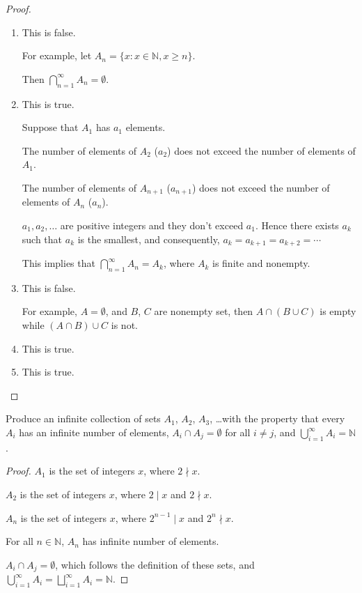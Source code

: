 \documentclass[class=understanding-analysis,crop=false]{standalone}
\begin{document}
\begin{proof}
    \begin{enumerate}[label = (\alph*)]
        \item This is false.
              \par For example, let $A_{n} = \{ x : x\in\mathbb{N}, x\ge n \}$.
              \par Then $\bigcap^{\infty}_{n=1}A_{n} = \emptyset$.
        \item This is true.
              \par Suppose that $A_{1}$ has $a_{1}$ elements.
              \par The number of elements of $A_{2}$ ($a_{2}$) does not exceed the number of elements of $A_{1}$.
              \par The number of elements of $A_{n+1}$ ($a_{n+1}$) does not exceed the number of elements of $A_{n}$ ($a_{n}$).
              \par $a_{1}, a_{2}, \ldots$ are positive integers and they don't exceed $a_{1}$. Hence there exists $a_{k}$ such that $a_{k}$ is the smallest, and consequently, $a_{k} = a_{k+1} = a_{k+2} = \cdots$
              \par This implies that $\bigcap^{\infty}_{n=1}A_{n} = A_{k}$, where $A_{k}$ is finite and nonempty.
        \item This is false.
              \par For example, $A = \emptyset$, and $B$, $C$ are nonempty set, then $A\cap (B\cup C)$ is empty while $(A\cap B)\cup C$ is not.
        \item This is true.
        \item This is true.
    \end{enumerate}
\end{proof}

\begin{exercise}
    \par Produce an infinite collection of sets $A_{1}$, $A_{2}$, $A_{3}$, \ldots with the property that every $A_{i}$ has an infinite number of elements, $A_{i}\cap A_{j} = \emptyset$ for all $i\ne j$, and $\bigcup^{\infty}_{i=1}A_{i} = \mathbb{N}$.
\end{exercise}

\begin{proof}
    \par $A_{1}$ is the set of integers $x$, where $2 \nmid x$.
    \par $A_{2}$ is the set of integers $x$, where $2 \mid x$ and $2 \nmid x$.
    \par $A_{n}$ is the set of integers $x$, where $2^{n-1} \mid x$ and $2^{n} \nmid x$.
    \par For all $n\in\mathbb{N}$, $A_{n}$ has infinite number of elements.
    \par $A_{i}\cap A_{j} = \emptyset$, which follows the definition of these sets, and $\bigcup^{\infty}_{i=1}A_{i} = \bigsqcup^{\infty}_{i=1}A_{i} = \mathbb{N}$.
\end{proof}
\end{document}
